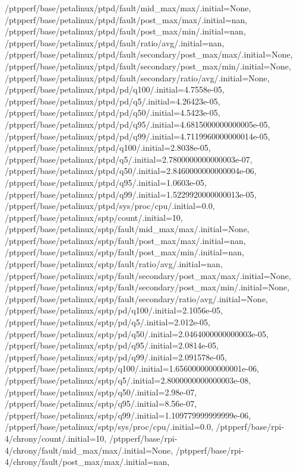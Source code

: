 {    /ptpperf/base/petalinux/ptpd/fault/mid_max/max/.initial=None,
    /ptpperf/base/petalinux/ptpd/fault/post_max/max/.initial=nan,
    /ptpperf/base/petalinux/ptpd/fault/post_max/min/.initial=nan,
    /ptpperf/base/petalinux/ptpd/fault/ratio/avg/.initial=nan,
    /ptpperf/base/petalinux/ptpd/fault/secondary/post_max/max/.initial=None,
    /ptpperf/base/petalinux/ptpd/fault/secondary/post_max/min/.initial=None,
    /ptpperf/base/petalinux/ptpd/fault/secondary/ratio/avg/.initial=None,
    /ptpperf/base/petalinux/ptpd/pd/q100/.initial=4.7558e-05,
    /ptpperf/base/petalinux/ptpd/pd/q5/.initial=4.26423e-05,
    /ptpperf/base/petalinux/ptpd/pd/q50/.initial=4.5423e-05,
    /ptpperf/base/petalinux/ptpd/pd/q95/.initial=4.6815000000000005e-05,
    /ptpperf/base/petalinux/ptpd/pd/q99/.initial=4.7119960000000014e-05,
    /ptpperf/base/petalinux/ptpd/q100/.initial=2.8038e-05,
    /ptpperf/base/petalinux/ptpd/q5/.initial=2.7800000000000003e-07,
    /ptpperf/base/petalinux/ptpd/q50/.initial=2.8460000000000004e-06,
    /ptpperf/base/petalinux/ptpd/q95/.initial=1.0603e-05,
    /ptpperf/base/petalinux/ptpd/q99/.initial=1.5229920000000013e-05,
    /ptpperf/base/petalinux/ptpd/sys/proc/cpu/.initial=0.0,
    /ptpperf/base/petalinux/sptp/count/.initial=10,
    /ptpperf/base/petalinux/sptp/fault/mid_max/max/.initial=None,
    /ptpperf/base/petalinux/sptp/fault/post_max/max/.initial=nan,
    /ptpperf/base/petalinux/sptp/fault/post_max/min/.initial=nan,
    /ptpperf/base/petalinux/sptp/fault/ratio/avg/.initial=nan,
    /ptpperf/base/petalinux/sptp/fault/secondary/post_max/max/.initial=None,
    /ptpperf/base/petalinux/sptp/fault/secondary/post_max/min/.initial=None,
    /ptpperf/base/petalinux/sptp/fault/secondary/ratio/avg/.initial=None,
    /ptpperf/base/petalinux/sptp/pd/q100/.initial=2.1056e-05,
    /ptpperf/base/petalinux/sptp/pd/q5/.initial=2.012e-05,
    /ptpperf/base/petalinux/sptp/pd/q50/.initial=2.0464000000000003e-05,
    /ptpperf/base/petalinux/sptp/pd/q95/.initial=2.0814e-05,
    /ptpperf/base/petalinux/sptp/pd/q99/.initial=2.091578e-05,
    /ptpperf/base/petalinux/sptp/q100/.initial=1.6560000000000001e-06,
    /ptpperf/base/petalinux/sptp/q5/.initial=2.8000000000000003e-08,
    /ptpperf/base/petalinux/sptp/q50/.initial=2.98e-07,
    /ptpperf/base/petalinux/sptp/q95/.initial=8.56e-07,
    /ptpperf/base/petalinux/sptp/q99/.initial=1.109779999999999e-06,
    /ptpperf/base/petalinux/sptp/sys/proc/cpu/.initial=0.0,
    /ptpperf/base/rpi-4/chrony/count/.initial=10,
    /ptpperf/base/rpi-4/chrony/fault/mid_max/max/.initial=None,
    /ptpperf/base/rpi-4/chrony/fault/post_max/max/.initial=nan,
}
